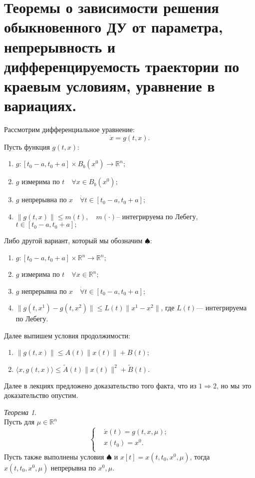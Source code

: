\documentclass[oneside, final, 14pt, draft]{article}
\theoremstyle{definition}
\theoremstyle{definition}
\theoremstyle{remark}
\theoremstyle{theorem}
\newtheorem{thm}{Теорема}[section]
\renewcommand{\leq}{\leqslant}
\begin{document}
\section{Теоремы о зависимости решения обыкновенного ДУ от параметра, непрерывность и дифференцируемость траектории по краевым условиям, уравнение в вариациях.}
Рассмотрим дифференциальное уравнение:
\begin{equation}
 \dot{x} = g(t, x).
 \label{DifEq}
\end{equation}
Пусть функция $g(t, x):$
\begin{enumerate}
\item $g: [t_0 - a, t_0+a] \times B_b (x^0) \rightarrow \mathbb{R}^n;$
\item $g$ измерима по $t \quad \forall x \in B_b (x^0);$
\item $g$ непрерывна по $x \quad \dot{\forall}t \in [t_0 - a, t_0+a];$
\item $\| g(t, x)\| \leq m(t), \quad m(\cdot)$-- интегрируема по Лебегу, $t \in [t_0 - a, t_0+a];$
\end{enumerate}
Либо другой вариант, который мы обозначим $\spadesuit$:
\begin{enumerate}
\item $g: [t_0 - a, t_0+a] \times \mathbb{R}^n \rightarrow \mathbb{R}^n;$
\item $g$ измерима по $t \quad \forall x \in \mathbb{R}^n;$
\item $g$ непрерывна по $x \quad \dot{\forall} t \in [t_0 - a, t_0+a];$
\item $\| g(t, x^1) - g(t, x^2)\| \leq L(t) \|x^1 - x^2\|$, где $L(t)$--- интегрируема по Лебегу.
\end{enumerate}
Далее выпишем условия продолжимости:
\begin{enumerate}
\item $\| g(t, x)\| \leq A(t)\|x(t)\| + B(t);$
\item $\langle x, g(t, x) \rangle \leq \widetilde{A}(t)\|x(t)\|^2 + \widetilde{B}(t).$
\end{enumerate}
Далее в лекциях предложено доказательство того факта, что из $1 \Rightarrow 2$, но мы это доказательство опустим.
\begin{thm} \ \\
Пусть для $\mu \in \mathbb{R}^n$
$$
\left\{
\begin{aligned}
	&\dot{x}(t)=g(t, x, \mu);\\
	&x(t_0) = x^0.\\
\end{aligned}
\right.
$$
Пусть также выполнены условия $\spadesuit$ и $x[t] = x(t, t_0, x^0, \mu)$, тогда $x(t, t_0, x^0, \mu)$ непрерывна по $x^0, \mu$.
\end{thm}
\end{document}
